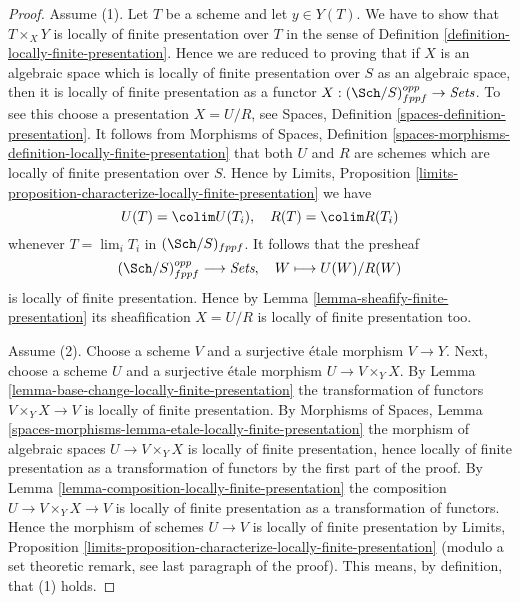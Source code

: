 \begin{proof}
Assume (1). Let $T$ be a scheme and let $y \in Y(T)$. We have to show that
$T \times_X Y$ is locally of finite presentation over $T$ in the sense of
Definition \ref{definition-locally-finite-presentation}.
Hence we are reduced to proving that if $X$ is an algebraic space which
is locally of finite presentation over $S$ as an algebraic space, then it
is locally of finite presentation as a functor
$X : (\Sch/S)_{fppf}^{opp} \to \textit{Sets}$.
To see this choose a presentation $X = U/R$, see
Spaces, Definition \ref{spaces-definition-presentation}.
It follows from
Morphisms of Spaces,
Definition \ref{spaces-morphisms-definition-locally-finite-presentation}
that both $U$ and $R$ are schemes which are locally of finite presentation
over $S$. Hence by
Limits, Proposition
\ref{limits-proposition-characterize-locally-finite-presentation}
we have
$$
U(T) = \colim U(T_i), \quad
R(T) = \colim R(T_i)
$$
whenever $T = \lim_i T_i$ in $(\Sch/S)_{fppf}$. It follows
that the presheaf
$$
(\Sch/S)_{fppf}^{opp} \longrightarrow \textit{Sets}, \quad
W \longmapsto U(W)/R(W)
$$
is locally of finite presentation. Hence by
Lemma \ref{lemma-sheafify-finite-presentation}
its sheafification $X = U/R$ is locally of finite presentation too.

\medskip\noindent
Assume (2). Choose a scheme $V$ and a surjective \'etale morphism
$V \to Y$. Next, choose a scheme $U$ and a surjective \'etale morphism
$U \to V \times_Y X$. By
Lemma \ref{lemma-base-change-locally-finite-presentation}
the transformation of functors $V \times_Y X \to V$ is locally of
finite presentation. By
Morphisms of Spaces,
Lemma \ref{spaces-morphisms-lemma-etale-locally-finite-presentation}
the morphism of algebraic spaces $U \to V \times_Y X$ is locally
of finite presentation, hence locally of finite presentation as
a transformation of functors by the first part of the proof. By
Lemma \ref{lemma-composition-locally-finite-presentation}
the composition $U \to V \times_Y X \to V$ is locally of
finite presentation as a transformation of functors. Hence
the morphism of schemes $U \to V$ is locally of finite presentation by
Limits, Proposition
\ref{limits-proposition-characterize-locally-finite-presentation}
(modulo a set theoretic remark, see last paragraph of the proof).
This means, by definition, that (1) holds.


\end{proof}
